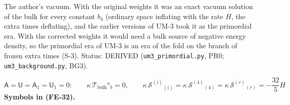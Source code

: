 \documentclass[
  10pt,
]{article}
\begin{document}
The author's vacuum. With the original weights it was an exact vacuum
solution of the bulk for every constant \(b_4\) (ordinary space
inflating with the rate \(H\), the extra times deflating), and the
earlier versions of UM-3 took it as the primordial era. With the
corrected weights it would need a bulk source of negative energy
density, so the primordial era of UM-3 is an era of the fold on the
branch of frozen extra times (S-3). Status: DERIVED
(\texttt{um3\_primordial.py}, PR0; \texttt{um3\_background.py}, BG3).

\[
\mathsf{A} = \mathsf{U} = \mathsf{A}_1 = \mathsf{U}_1 = 0:\qquad \kappa\,\mathcal{T}_{\mathrm{bulk}}{}^a{}_b = 0,\qquad
\kappa\,\mathcal{S}^{(i)}{}_{(i)} = \kappa\,\mathcal{S}^{(4)}{}_{(4)} = \kappa\,\mathcal{S}^{(r)}{}_{(r)} = -\frac{32}{5}H \tag{FE-32}
\] \textbf{Symbols in (FE-32).}
\end{document}
